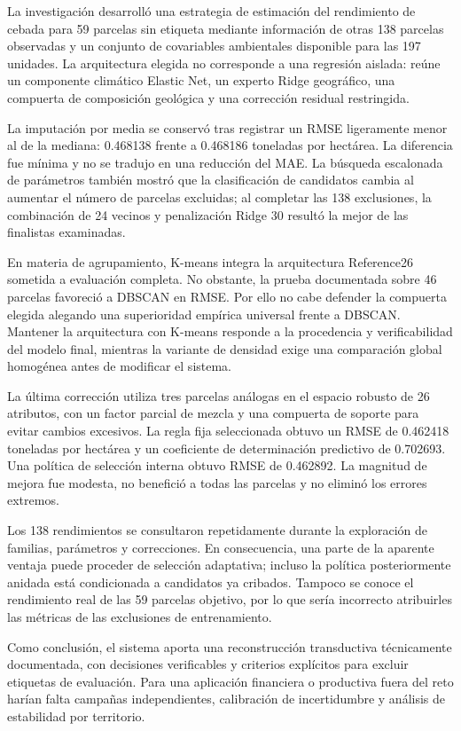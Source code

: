 La investigación desarrolló una estrategia de estimación del rendimiento de cebada para 59 parcelas sin etiqueta mediante información de otras 138 parcelas observadas y un conjunto de covariables ambientales disponible para las 197 unidades. La arquitectura elegida no corresponde a una regresión aislada: reúne un componente climático Elastic Net, un experto Ridge geográfico, una compuerta de composición geológica y una corrección residual restringida. 

La imputación por media se conservó tras registrar un RMSE ligeramente menor al de la mediana: 0.468138 frente a 0.468186 toneladas por hectárea. La diferencia fue mínima y no se tradujo en una reducción del MAE.  La búsqueda escalonada de parámetros también mostró que la clasificación de candidatos cambia al aumentar el número de parcelas excluidas; al completar las 138 exclusiones, la combinación de 24 vecinos y penalización Ridge 30 resultó la mejor de las finalistas examinadas.

En materia de agrupamiento, K-means integra la arquitectura Reference26 sometida a evaluación completa. No obstante, la prueba documentada sobre 46 parcelas favoreció a DBSCAN en RMSE. Por ello no cabe defender la compuerta elegida alegando una superioridad empírica universal frente a DBSCAN. Mantener la arquitectura con K-means responde a la procedencia y verificabilidad del modelo final, mientras la variante de densidad exige una comparación global homogénea antes de modificar el sistema.

La última corrección utiliza tres parcelas análogas en el espacio robusto de 26 atributos, con un factor parcial de mezcla y una compuerta de soporte para evitar cambios excesivos. La regla fija seleccionada obtuvo un RMSE de 0.462418 toneladas por hectárea y un coeficiente de determinación predictivo de 0.702693. Una política de selección interna obtuvo RMSE de 0.462892. La magnitud de mejora fue modesta, no benefició a todas las parcelas y no eliminó los errores extremos.

 Los 138 rendimientos se consultaron repetidamente durante la exploración de familias, parámetros y correcciones. En consecuencia, una parte de la aparente ventaja puede proceder de selección adaptativa; incluso la política posteriormente anidada está condicionada a candidatos ya cribados. Tampoco se conoce el rendimiento real de las 59 parcelas objetivo, por lo que sería incorrecto atribuirles las métricas de las exclusiones de entrenamiento.

Como conclusión, el sistema aporta una reconstrucción transductiva técnicamente documentada, con decisiones verificables y criterios explícitos para excluir etiquetas de evaluación. Para una aplicación financiera o productiva fuera del reto harían falta campañas independientes, calibración de incertidumbre y análisis de estabilidad por territorio. 
